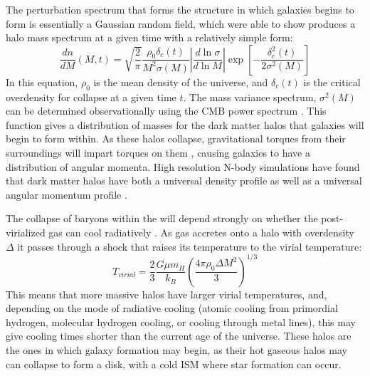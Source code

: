 The perturbation spectrum that forms the structure in which galaxies begins to
form is essentially a Gaussian random field, which \citet{Press1974} were able
to show produces a halo mass spectrum at a given time with a relatively simple form:
\begin{equation}
    \frac{dn}{dM}(M,t) =
    \sqrt{\frac{2}{\pi}}\frac{\rho_0\delta_c(t)}{M^2\sigma(M)} 
    \left\lvert\frac{d\ln{\sigma}}{d\ln{M}}\right\rvert
    \exp{\left[-\frac{\delta^2_c(t)}{2\sigma^2(M)}\right]}
\end{equation}
In this equation, $\rho_0$ is the mean density of the universe, and
$\delta_c(t)$ is the critical overdensity for collapse at a given time $t$.  The
mass variance spectrum, $\sigma^2(M)$ can be determined observationally using
the CMB power spectrum \citep{Planck2015}.  This function gives a distribution
of masses for the dark matter halos that galaxies will begin to form within.  As
these halos collapse, gravitational torques from their surroundings will impart
torques on them \citep{Barnes1987}, causing galaxies to have a distribution of angular momenta.
High resolution N-body simulations have found that dark matter halos have both a
universal density profile \citep{Navarro1996,Merritt2006} as well as a universal
angular momentum profile \citep{Bullock2001}.  

The collapse of baryons within the will depend strongly on whether the
post-virialized gas can cool radiatively \citep{Rees1977}.  As gas accretes onto
a halo with overdensity $\Delta$ it passes through a shock that raises its
temperature to the virial temperature:
\begin{equation}
    T_{virial} = \frac{2}{3}\frac{G\mu m_H}{k_B}\left({\frac{4\pi\rho_0\Delta
    M^2}{3}}\right)^{1/3}
\end{equation}
This means that more massive halos have larger virial temperatures, and,
depending on the mode of radiative cooling (atomic cooling from primordial
hydrogen, molecular hydrogen cooling, or cooling through metal lines), this may
give cooling times shorter than the current age of the universe.  These halos 
are the ones in which galaxy formation may begin, as their hot gaseous halos may
can collapse to form a disk, with a cold ISM where star formation can occur.

